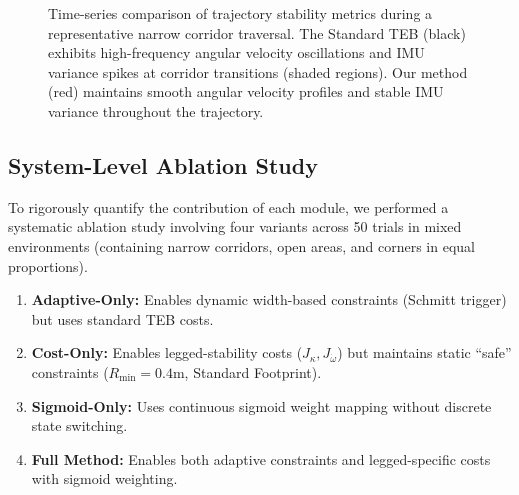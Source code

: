\documentclass[lettersize,journal]{IEEEtran}
\begin{document}
\begin{figure}[!t]
\centering
\caption{Time-series comparison of trajectory stability metrics during a representative narrow corridor traversal. The Standard TEB (black) exhibits high-frequency angular velocity oscillations and IMU variance spikes at corridor transitions (shaded regions). Our method (red) maintains smooth angular velocity profiles and stable IMU variance throughout the trajectory.}
\label{fig:stability_timeseries}
\end{figure}

\subsection{System-Level Ablation Study}
To rigorously quantify the contribution of each module, we performed a systematic ablation study involving four variants across 50 trials in mixed environments (containing narrow corridors, open areas, and corners in equal proportions).
\begin{enumerate}
\item \textbf{Adaptive-Only:} Enables dynamic width-based constraints (Schmitt trigger) but uses standard TEB costs.
\item \textbf{Cost-Only:} Enables legged-stability costs ($J_{\kappa}, J_{\dot{\omega}}$) but maintains static ``safe'' constraints ($R_{\min}=0.4\text{m}$, Standard Footprint).
\item \textbf{Sigmoid-Only:} Uses continuous sigmoid weight mapping without discrete state switching.
\item \textbf{Full Method:} Enables both adaptive constraints and legged-specific costs with sigmoid weighting.
\end{enumerate}
\end{document}
